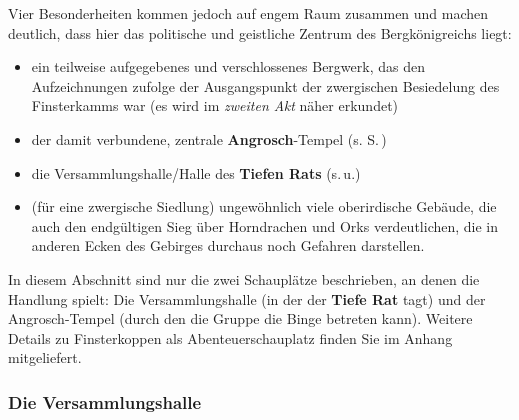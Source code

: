 Vier Besonderheiten kommen jedoch auf engem Raum zusammen und machen deutlich, dass hier das politische und geistliche Zentrum des Bergkönigreichs liegt:
\begin{itemize}
	\item ein teilweise aufgegebenes und verschlossenes Bergwerk, das den Aufzeichnungen zufolge der Ausgangspunkt der zwergischen Besiedelung des Finsterkamms war (es wird im \emph{zweiten Akt} näher erkundet)
	\item der damit verbundene, zentrale \textbf{Angrosch}-Tempel (s. S.\,\pageref{angrosch})
	\item die Versammlungshalle/Halle des \textbf{Tiefen Rats} (s.\,u.)
	\item (für eine zwergische Siedlung)  ungewöhnlich viele oberirdische Gebäude, die auch den endgültigen Sieg über Horndrachen und Orks verdeutlichen,
	die in anderen Ecken des Gebirges durchaus noch Gefahren darstellen.
\end{itemize}

In diesem Abschnitt sind nur die zwei Schauplätze beschrieben, an denen die Handlung spielt: Die Versammlungshalle (in der der \textbf{Tiefe Rat} tagt) und der Angrosch-Tempel (durch den die Gruppe die Binge betreten kann). Weitere Details zu Finsterkoppen als Abenteuerschauplatz finden Sie im Anhang mitgeliefert.


\vfill

\subsubsection{Die Versammlungshalle}



